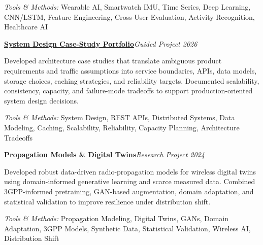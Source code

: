 \documentclass[9pt,letterpaper]{extarticle}
\newcommand{\entry}[2]{\Needspace{4\baselineskip}\textbf{#1}\hfill\textit{#2}\par}
\begin{document}
{\small\textit{Tools \& Methods:} Wearable AI, Smartwatch IMU, Time Series, Deep Learning, CNN/LSTM, Feature Engineering, Cross-User Evaluation, Activity Recognition, Healthcare AI\par}
\vspace{1pt}
\entry{\href{https://github.com/WaseemRaza844/system-design-masterclass}{System Design Case-Study Portfolio}}{Guided Project \textbar{} 2026}
Developed architecture case studies that translate ambiguous product requirements and traffic assumptions into service boundaries, APIs, data models, storage choices, caching strategies, and reliability targets. Documented scalability, consistency, capacity, and failure-mode tradeoffs to support production-oriented system design decisions.\par
{\small\textit{Tools \& Methods:} System Design, REST APIs, Distributed Systems, Data Modeling, Caching, Scalability, Reliability, Capacity Planning, Architecture Tradeoffs\par}
\vspace{1pt}
\entry{Propagation Models \& Digital Twins}{Research Project \textbar{} 2024}
Developed robust data-driven radio-propagation models for wireless digital twins using domain-informed generative learning and scarce measured data. Combined 3GPP-informed pretraining, GAN-based augmentation, domain adaptation, and statistical validation to improve resilience under distribution shift.\par
{\small\textit{Tools \& Methods:} Propagation Modeling, Digital Twins, GANs, Domain Adaptation, 3GPP Models, Synthetic Data, Statistical Validation, Wireless AI, Distribution Shift\par}
\vspace{1pt}
\end{document}
